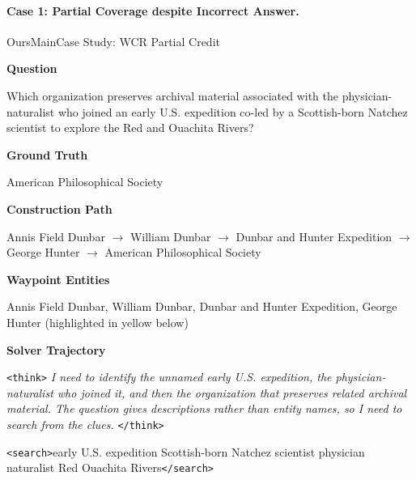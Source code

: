 \paragraph{Case 1: Partial Coverage despite Incorrect Answer.}
\begin{casebox}{OursMain}{Case Study: WCR Partial Credit}

\noindent\colorbox{TagSearch!20}{\parbox{\dimexpr\linewidth-2\fboxsep}{\textcolor{TagSearch}{\textbf{Question}}}}

Which organization preserves archival material associated with the physician-naturalist who joined an early U.S. expedition co-led by a Scottish-born Natchez scientist to explore the Red and Ouachita Rivers?

\vspace{3mm}
\noindent\colorbox{TagAnswer!20}{\parbox{\dimexpr\linewidth-2\fboxsep}{\textcolor{TagAnswer}{\textbf{Ground Truth}}}}

American Philosophical Society

\vspace{3mm}
\noindent\colorbox{TagInfo!20}{\parbox{\dimexpr\linewidth-2\fboxsep}{\textcolor{TagInfo}{\textbf{Construction Path}}}}

{\small Annis Field Dunbar $\to$ William Dunbar $\to$ Dunbar and Hunter Expedition $\to$ George Hunter $\to$ American Philosophical Society}

\vspace{3mm}
\noindent\colorbox{TagWaypoint!20}{\parbox{\dimexpr\linewidth-2\fboxsep}{\textcolor{TagWaypoint}{\textbf{Waypoint Entities}}}}

Annis Field Dunbar, William Dunbar, Dunbar and Hunter Expedition, George Hunter \quad (highlighted in \colorbox{yellow!30}{yellow} below)

\vspace{3mm}
\noindent\colorbox{OursMain!20}{\parbox{\dimexpr\linewidth-2\fboxsep}{\textcolor{OursMain}{\textbf{Solver Trajectory}}}}

\begin{thinkpanel}
\textcolor{TagThink}{\texttt{<think>}} \textit{I need to identify the unnamed early U.S. expedition, the physician-naturalist who joined it, and then the organization that preserves related archival material. The question gives descriptions rather than entity names, so I need to search from the clues.} \textcolor{TagThink}{\texttt{</think>}}
\end{thinkpanel}

\textcolor{TagSearch}{\texttt{<search>}}early U.S. expedition Scottish-born Natchez scientist physician naturalist Red Ouachita Rivers\textcolor{TagSearch}{\texttt{</search>}}


\end{casebox}

